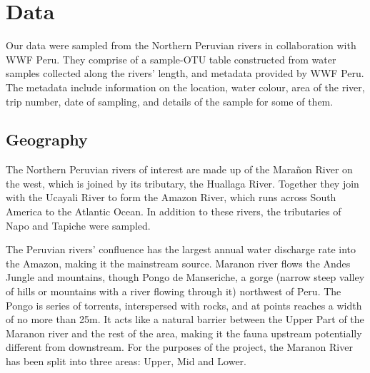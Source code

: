 %



\section{Data}
Our data were sampled from the Northern Peruvian rivers in collaboration with WWF Peru. They comprise of a sample-OTU table constructed from water samples collected along the rivers' length, and metadata provided by WWF Peru. The metadata include information on the location, water colour, area of the river, trip number, date of sampling, and details of the sample for some of them.
\subsection{Geography}
The Northern Peruvian rivers of interest are made up of the Marañon River on the west, which is joined by its tributary, the Huallaga River. Together they join with the Ucayali River to form the Amazon River, which runs across South America to the Atlantic Ocean. In addition to these rivers, the tributaries of Napo and Tapiche were sampled. 

The Peruvian rivers' confluence has the largest annual water discharge rate into the Amazon, making it the mainstream  source. Maranon river flows the Andes Jungle and mountains, though Pongo de Manseriche, a gorge (narrow steep valley of hills or mountains with a river flowing through it) northwest of Peru. The Pongo is series of torrents, interspersed with rocks, and at points reaches a width of no more than 25m. It acts like a natural barrier between the Upper Part of the Maranon river and the rest of the area, making it the fauna upstream potentially different from downstream. For the purposes of the project, the Maranon River has been split into three areas: Upper, Mid and Lower. 

